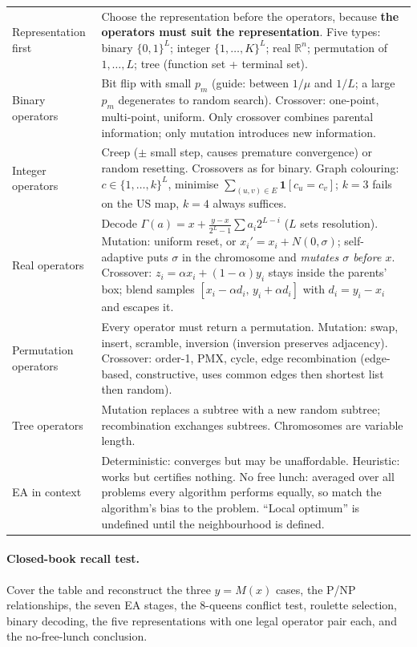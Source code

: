 \documentclass[11pt,a4paper]{article}
\newcommand{\R}{\mathbb{R}}
\begin{document}
\begin{tabular}{@{}>{\bfseries\raggedright\arraybackslash}p{}
  >{\raggedright\arraybackslash}p{}@{}}
Representation first & Choose the representation before the operators, because \textbf{the operators must suit the representation}. Five types: binary $\{0,1\}^L$; integer $\{1,\ldots,K\}^L$; real $\R^n$; permutation of $1,\ldots,L$; tree (function set + terminal set).\\
Binary operators & Bit flip with small $p_m$ (guide: between $1/\mu$ and $1/L$; a large $p_m$ degenerates to random search). Crossover: one-point, multi-point, uniform. Only crossover combines parental information; only mutation introduces new information.\\
Integer operators & Creep ($\pm$ small step, causes premature convergence) or random resetting. Crossovers as for binary. Graph colouring: $c\in\{1,\ldots,k\}^L$, minimise $\sum_{(u,v)\in E}\mathbf 1[c_u=c_v]$; $k=3$ fails on the US map, $k=4$ always suffices.\\
Real operators & Decode $\Gamma(a)=x+\frac{y-x}{2^L-1}\sum a_i2^{L-i}$ ($L$ sets resolution). Mutation: uniform reset, or $x_i'=x_i+N(0,\sigma)$; self-adaptive puts $\sigma$ in the chromosome and \emph{mutates $\sigma$ before $x$}. Crossover: $z_i=\alpha x_i+(1-\alpha)y_i$ stays inside the parents' box; blend samples $[x_i-\alpha d_i,\,y_i+\alpha d_i]$ with $d_i=y_i-x_i$ and escapes it.\\
Permutation operators & Every operator must return a permutation. Mutation: swap, insert, scramble, inversion (inversion preserves adjacency). Crossover: order-1, PMX, cycle, edge recombination (edge-based, constructive, uses common edges then shortest list then random).\\
Tree operators & Mutation replaces a subtree with a new random subtree; recombination exchanges subtrees. Chromosomes are variable length.\\
EA in context & Deterministic: converges but may be unaffordable. Heuristic: works but certifies nothing. No free lunch: averaged over all problems every algorithm performs equally, so match the algorithm's bias to the problem. ``Local optimum'' is undefined until the neighbourhood is defined.\\
\bottomrule
\end{tabular}

\paragraph{Closed-book recall test.}
Cover the table and reconstruct the three $y=M(x)$ cases, the P/NP relationships, the seven EA stages, the 8-queens conflict test, roulette selection, binary decoding, the five representations with one legal operator pair each, and the no-free-lunch conclusion.
\end{document}

